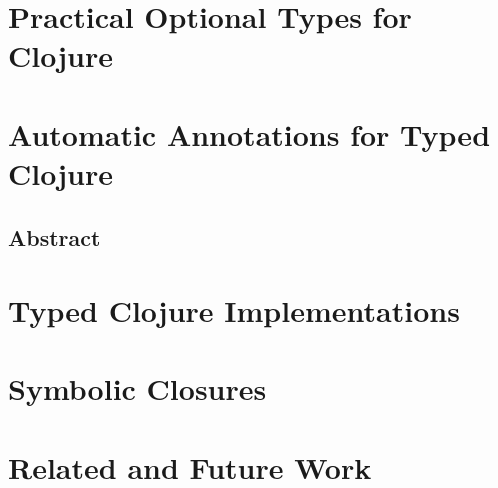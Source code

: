 \documentclass[11pt,final]{iuthesis}
\begin{document}
\part{Practical Optional Types for Clojure}
\label{part:types}









\part{Automatic Annotations for Typed Clojure}
\label{part:autoann}

\chapter{Abstract}







%


%
%
%
%

\part{Typed Clojure Implementations}
\label{part:implementations}


\part{%
Symbolic Closures}
\label{part:symbolic-closures}



\part{Related and Future Work}
\label{part:related-future-work}


\end{document}
